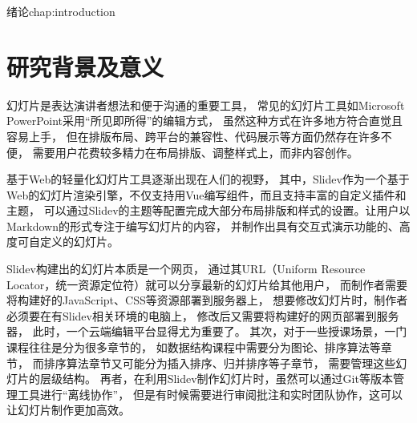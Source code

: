 \begin{cuzchapter}{绪论}{chap:introduction}

	\section{研究背景及意义}\label{sec:background}

	
	幻灯片是表达演讲者想法和便于沟通的重要工具，
	常见的幻灯片工具如Microsoft PowerPoint采用“所见即所得”的编辑方式，
	虽然这种方式在许多地方符合直觉且容易上手，
	但在排版布局、跨平台的兼容性、代码展示等方面仍然存在许多不便，
	需要用户花费较多精力在布局排版、调整样式上，而非内容创作。

	基于Web的轻量化幻灯片工具逐渐出现在人们的视野，
	其中，Slidev作为一个基于Web的幻灯片渲染引擎，不仅支持用Vue编写组件，而且支持丰富的自定义插件和主题，
	可以通过Slidev的主题等配置完成大部分布局排版和样式的设置。让用户以Markdown的形式专注于编写幻灯片的内容，
	并制作出具有交互式演示功能的、高度可自定义的幻灯片\cite{slidevteam2026slidedoc}。

Slidev构建出的幻灯片本质是一个网页，
通过其URL（Uniform Resource Locator，统一资源定位符）就可以分享最新的幻灯片给其他用户，
而制作者需要将构建好的JavaScript、CSS等资源部署到服务器上，
想要修改幻灯片时，制作者必须要在有Slidev相关环境的电脑上，
修改后又需要将构建好的网页部署到服务器，
此时，一个云端编辑平台显得尤为重要了。
其次，对于一些授课场景，一门课程往往是分为很多章节的，
如数据结构课程中需要分为图论、排序算法等章节，
而排序算法章节又可能分为插入排序、归并排序等子章节，
需要管理这些幻灯片的层级结构。
再者，在利用Slidev制作幻灯片时，虽然可以通过Git等版本管理工具进行“离线协作”，
但是有时候需要进行审阅批注和实时团队协作，这可以让幻灯片制作更加高效。


\end{cuzchapter}
